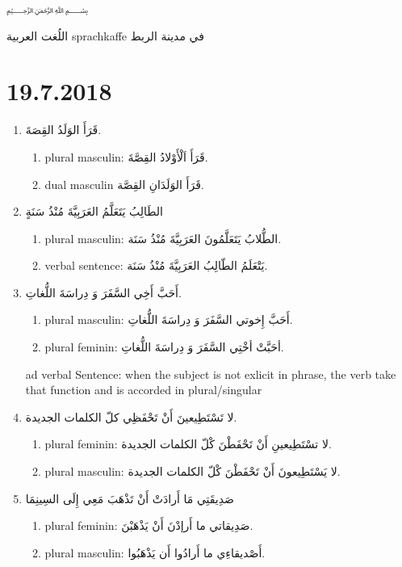 \documentclass[a4paper]{article}
\begin{document}
﷽


\begin{center}
  اللُغت العربية \textenglish{sprachkaffe}  في مدينة الربط
\end{center}

\section{\textenglish{19.7.2018}}

\begin{enumerate}
\item  قَرَأَ الوَلَدُ القِصَةَ.
  \begin{enumerate}
  \item \textenglish{plural masculin:} قَرَأَ اَلْأَوْلادُ القِصَّةَ.
  \item \textenglish{dual masculin} قَرَأَ الوَلَدَانِ القِصَّة.
  \end{enumerate}
\item الطَالِبُ يَتَعَلَّمُ العَرَبِيَّةَ مُنْذُ سَنَةٍ
  \begin{enumerate}
  \item \textenglish{plural masculin}: الطُّلابُ يَتَعَلَّمُونَ العَرَبِيَّةَ مُنْذُ سَنَة.
  \item \textenglish{verbal sentence}: يَتْعَلَمُ الطّالِبُ العَرَبِيَّةَ مُنْذُ سَنَة.
  \end{enumerate}
\item أَحَبَّ أَخِي السَّفَرَ وَ دِراسَةَ اللُّغاتِ.
\begin{enumerate}
  \item \textenglish{plural masculin}: أَحَبَّ إِخوتي  السَّفَرَ وَ دِراسَةَ اللُّغاتِ. 
  \item \textenglish{plural feminin}: أحَبَّتْ أخْتِي  السَّفَرَ وَ دِراسَةَ اللُّغاتِ. 
  \end{enumerate}

  \textenglish{ad verbal Sentence: when the subject is not exlicit in phrase, the verb take that function and is accorded in plural/singular}
  
\item لا تَسْتَطِيعينَ  أَنْ تَحْفَظِي كلّ الكلمات الجديدة. %
\begin{enumerate}
  \item \textenglish{plural feminin}: لا تسْتَطِيعينِ أَنْ تَحْفَطْنَ كْلّ  الكلمات الجديدة. 
  \item \textenglish{plural masculin}: لا يَسْتَطِيعونَ  أَنْ تَحْفَطْنَ كْلّ  الكلمات الجديدة.
  \end{enumerate}
\item صَدِيقَتِي مَا أَرادَتْ أَنْ تَذْهَبَ مَعِي إِلَى السِينِمَا
\begin{enumerate}
  \item \textenglish{plural feminin}: صَدِيقاتي ما أَرإدْنَ أَنْ يَذْهَبْنَ.
  \item \textenglish{plural masculin}: أَصْديقاءِي ما أَرادُوا أَن يَذْهَبُوا.
  \end{enumerate}
\end{enumerate}  
\end{document}

